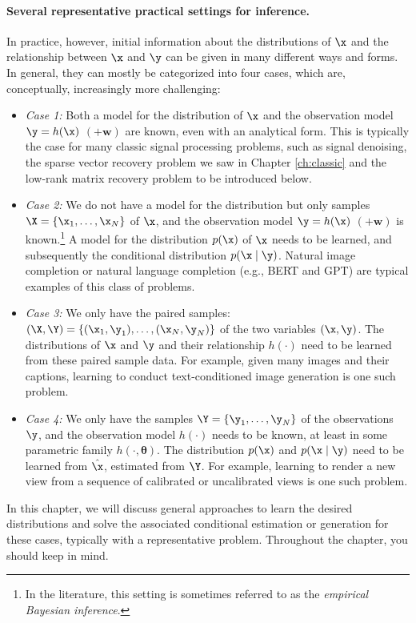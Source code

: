 \documentclass[../../book-main.tex]{subfiles}
\begin{document}
\paragraph{Several representative practical settings for inference.} 
In practice, however, initial information about the distributions of $\x$ and the relationship between $\x$ and $\y$ can be given in many different ways and forms. In general, they can mostly be categorized into four cases, which are, conceptually, increasingly more challenging:
\begin{itemize}
\item {\em Case 1:} Both a model for the distribution of $\x$ and the observation model $\y = h(\x)$ $(+ \boldsymbol{w})$ are known, even with an analytical form. This is typically the case for many classic signal processing problems, such as signal denoising, the sparse vector recovery problem we saw in Chapter \ref{ch:classic} and the low-rank matrix recovery problem to be introduced below.
\item {\em Case 2:} We do not have a model for the distribution but only samples $\X = \{\x_1, \ldots, \x_N\}$ of $\x$, and the observation model $\y = h(\x)$ $ (+ \boldsymbol{w})$ is known.\footnote{In the literature, this setting is sometimes referred to as the {\em empirical Bayesian inference}.} A model for the distribution $p(\x)$ of $\x$ needs to be learned, and subsequently the conditional distribution $p(\x\mid \y)$. Natural image completion or natural language completion (e.g., BERT and GPT) are typical examples of this class of problems.
\item {\em Case 3:} We only have the paired samples: $(\X, \Y) = \{ (\x_1, \y_1), \ldots, (\x_N, \y_N) \}$ of the two variables  $(\x, \y)$. The distributions of $\x$ and $\y$ and their relationship $h(\cdot)$ need to be learned from these paired sample data. For example, given many images and their captions, learning to conduct text-conditioned image generation is one such problem. 
\item {\em Case 4:} We only have the samples $\Y = \{\y_1, \ldots, \y_N\}$ of the observations $\y$, and the observation model $h(\cdot)$ needs to be known, at least in some parametric family $h(\cdot, \boldsymbol{\theta})$. The distribution $p(\x)$ and $p(\x \mid \y)$ need to be learned from $\hat \x$, estimated from $\Y$. For example, learning to render a new view from a sequence of calibrated or uncalibrated views is one such problem.
\end{itemize}
In this chapter, we will discuss general approaches to learn the desired distributions and solve the associated conditional estimation or generation for these cases, typically with a representative problem.  Throughout the chapter, you should keep  in mind.
\end{document}
